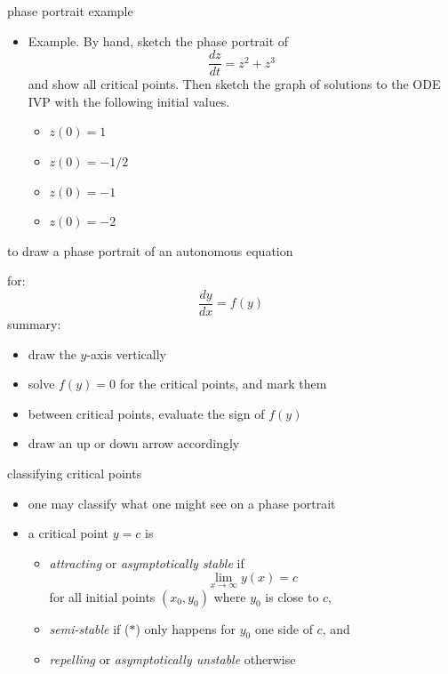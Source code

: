 \documentclass[colorlinks]{beamer}
\begin{document}
\begin{frame}{phase portrait example}

\begin{itemize}
\small
\item \begin{minipage}[t]{0.4\textwidth}
Example.  By hand, sketch the phase portrait of
   $$\frac{dz}{dt} = z^2 + z^3$$
and show all critical points.  Then sketch the graph of solutions to the ODE IVP with the following initial values.
    \begin{itemize}
    \item[\color{black} \textbf{(a)}] $z(0)=1$
    \item[\color{black} \textbf{(b)}] $z(0)=-1/2$
    \item[\color{black} \textbf{(c)}] $z(0)=-1$
    \item[\color{black} \textbf{(c)}] $z(0)=-2$
    \end{itemize}
\end{minipage}
\end{itemize}
\end{frame}


\begin{frame}{to draw a phase portrait of an autonomous equation}

for:
    $$\frac{dy}{dx}=f(y)$$
summary:
\begin{itemize}
    \item draw the $y$-axis vertically
    \item solve $f(y)=0$ for the critical points, and mark them
    \item between critical points, evaluate the sign of $f(y)$
    \item draw an up or down arrow accordingly
\end{itemize}
\end{frame}


\begin{frame}{classifying critical points}

\begin{itemize}
\item one may classify what one might see on a phase portrait

\medskip
\item a critical point $y=c$ is
    \begin{itemize}
    \item \emph{attracting} or \emph{asymptotically stable} if
\begin{equation}
        \lim_{x \to \infty} y(x) = c   \tag{$\ast$}
\end{equation}
    for all initial points $(x_0,y_0)$ where $y_0$ is close to $c$,
    \item \emph{semi-stable} if ($\ast$) only happens for $y_0$ one side of $c$, and
    \item \emph{repelling} or \emph{asymptotically unstable} otherwise
    \end{itemize}
\end{itemize}
\end{frame}
\end{document}
